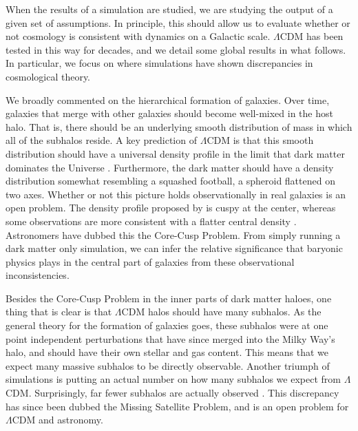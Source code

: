 When the results of a simulation are studied, we are studying the output of a given set of assumptions. In principle, this should allow us to evaluate whether or not cosmology is consistent with dynamics on a Galactic scale. $\Lambda$CDM has been tested in this way for decades, and we detail some global results in what follows. In particular, we focus on where simulations have shown discrepancies in cosmological theory.

We broadly commented on the hierarchical formation of galaxies. Over time, galaxies that merge with other galaxies should become well-mixed in the host halo. That is, there should be an underlying smooth distribution of mass in which all of the subhalos reside. A key prediction of $\Lambda$CDM is that this smooth distribution should have a universal density profile in the limit that dark matter dominates the Universe \citep{nfw}. Furthermore, the dark matter should have a density distribution somewhat resembling a squashed football, a spheroid flattened on two axes. Whether or not this picture holds observationally in real galaxies is an open problem. The density profile proposed by \citet{nfw} is cuspy at the center, whereas some observations are more consistent with a flatter central density \citep{de_blok_core_cusp}. Astronomers have dubbed this the Core-Cusp Problem. From simply running a dark matter only simulation, we can infer the relative significance that baryonic physics plays in the central part of galaxies from these observational inconsistencies.

Besides the Core-Cusp Problem in the inner parts of dark matter haloes, one thing that is clear is that $\Lambda$CDM halos should have many subhalos. As the general theory for the formation of galaxies goes, these subhalos were at one point independent perturbations that have since merged into the Milky Way's halo, and should have their own stellar and gas content. This means that we expect many massive subhalos to be directly observable. Another triumph of simulations is putting an actual number on how many subhalos we expect from $\Lambda$CDM. Surprisingly, far fewer subhalos are actually observed \citep{mooresubhalos, Klypin1999, springel2008}. This discrepancy has since been dubbed the Missing Satellite Problem, and is an open problem for $\Lambda$CDM and astronomy.



